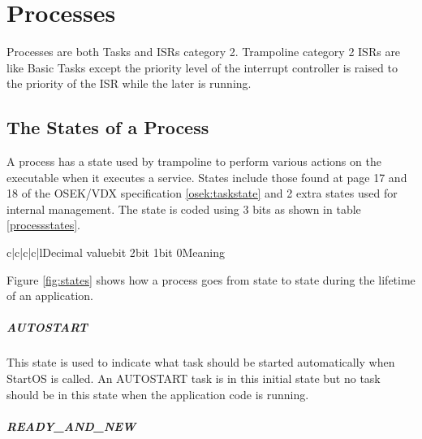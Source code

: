 \chapter{Processes}

Processes are both Tasks and ISRs category 2. Trampoline category 2 ISRs are like Basic Tasks except the priority level of the interrupt controller is raised to the priority of the ISR while the later is running.

\section{The States of a Process}

A process has a state used by trampoline to perform various actions on the executable when it executes a service. States include those found at page 17 and 18 of the OSEK/VDX specification \ref{osek:taskstate} and 2 extra states used for internal management. The state is coded using 3 bits as shown in table \ref{processstates}.

\begin{table}[htdp]
\caption{States of a process}
\begin{center}
\begin{longtablev}{c|c|c|c|l}{}{Decimal value}{bit 2}{bit 1}{bit 0}{Meaning}
\end{longtablev}
\end{center}
\label{processstates}
\end{table}%

Figure \ref{fig:states} shows how a process goes from state to state during the lifetime of an application.

\paragraph{AUTOSTART}

This state is used to indicate what task should be started automatically when StartOS is called. An AUTOSTART task is in this initial state but no task should be in this state when the application code is running.

\paragraph{READY\_AND\_NEW}

